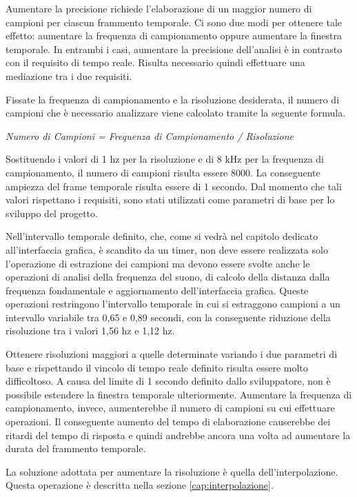 Aumentare la precisione richiede l'elaborazione di un maggior numero di campioni per ciascun frammento temporale. 
Ci sono due modi per ottenere tale effetto: aumentare la frequenza di campionamento oppure aumentare la finestra temporale.
In entrambi i casi, aumentare la precisione dell'analisi è in contrasto con il requisito di tempo reale.
Risulta necessario quindi effettuare una mediazione tra i due requisiti.

Fissate la frequenza di campionamento e la risoluzione desiderata, il numero di campioni che è necessario analizzare viene calcolato tramite la seguente formula.

\vspace{0.2cm}
\centerline{\textit{Numero di Campioni = Frequenza di Campionamento / Risoluzione}}
\vspace{0.2cm}

Sostituendo i valori di 1 hz per la risoluzione e di 8 kHz per la frequenza di campionamento, il numero di campioni risulta essere 8000. 
La conseguente ampiezza del frame temporale risulta essere di 1 secondo.
Dal momento che tali valori rispettano i requisiti, sono stati utilizzati come parametri di base per lo sviluppo del progetto.

Nell'intervallo temporale definito, che, come si vedrà nel capitolo dedicato all'interfaccia grafica, è scandito da un timer, non deve essere realizzata solo l'operazione di estrazione dei campioni ma devono essere svolte anche le operazioni di analisi della frequenza del suono, di calcolo della distanza dalla frequenza fondamentale e aggiornamento dell'interfaccia grafica. 
Queste operazioni restringono l'intervallo temporale in cui si estraggono campioni a un intervallo variabile tra 0,65 e 0,89 secondi, con la conseguente riduzione della risoluzione tra i valori 1,56 hz e 1,12 hz.

Ottenere risoluzioni maggiori a quelle determinate variando i due parametri di base e rispettando il vincolo di tempo reale definito risulta essere molto difficoltoso. 
A causa del limite di 1 secondo definito dallo sviluppatore, non è possibile estendere la finestra temporale ulteriormente.
Aumentare la frequenza di campionamento, invece, aumenterebbe il numero di campioni su cui effettuare operazioni. 
Il conseguente aumento del tempo di elaborazione causerebbe dei ritardi del tempo di risposta e quindi andrebbe ancora una volta ad aumentare la durata del frammento temporale.

La soluzione adottata per aumentare la risoluzione è quella dell'interpolazione.
Questa operazione è descritta nella sezione \ref{cap:interpolazione}.

